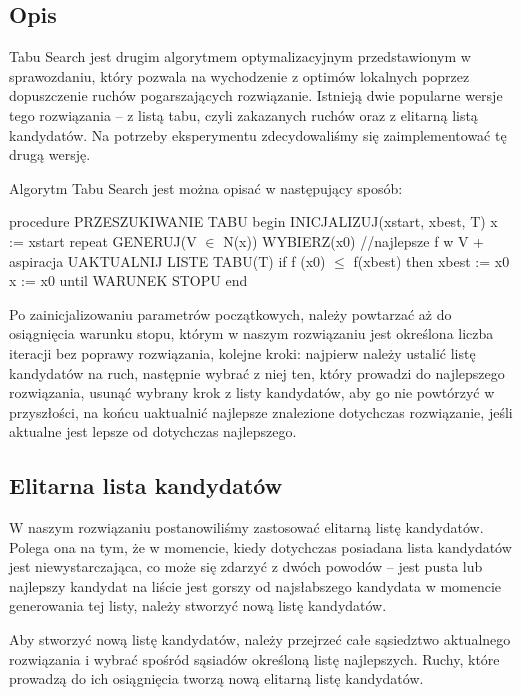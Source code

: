 \subsection{Opis}

Tabu Search jest drugim algorytmem optymalizacyjnym przedstawionym w sprawozdaniu, który pozwala na wychodzenie z optimów lokalnych poprzez dopuszczenie ruchów pogarszających rozwiązanie. Istnieją dwie popularne wersje tego rozwiązania -- z listą tabu, czyli zakazanych ruchów oraz z elitarną listą kandydatów. Na potrzeby eksperymentu zdecydowaliśmy się zaimplementować tę drugą wersję.

Algorytm Tabu Search jest można opisać w następujący sposób\cite{TS}:

\begin{algorithm}[caption={Integer division.}, label={alg1}]
procedure PRZESZUKIWANIE TABU
begin
  INICJALIZUJ(xstart, xbest, T)
  x := xstart
  repeat
    GENERUJ(V $\in$ N(x))
    WYBIERZ(x0) //najlepsze f w V + aspiracja
    UAKTUALNIJ LISTE TABU(T)
    if f (x0) $\le$ f(xbest) then xbest := x0
    x := x0
  until WARUNEK STOPU
end
\end{algorithm}

Po zainicjalizowaniu parametrów początkowych, należy powtarzać aż do osiągnięcia warunku stopu, którym w naszym rozwiązaniu jest określona liczba iteracji bez poprawy rozwiązania, kolejne kroki: najpierw należy ustalić listę kandydatów na ruch, następnie wybrać z niej ten, który prowadzi do najlepszego rozwiązania, usunąć wybrany krok z listy kandydatów, aby go nie powtórzyć w przyszłości, na końcu uaktualnić najlepsze znalezione dotychczas rozwiązanie, jeśli aktualne jest lepsze od dotychczas najlepszego.

\subsection{Elitarna lista kandydatów}

W naszym rozwiązaniu postanowiliśmy zastosować elitarną listę kandydatów. Polega ona na tym, że w momencie, kiedy dotychczas posiadana lista kandydatów jest niewystarczająca, co może się zdarzyć z dwóch powodów -- jest pusta lub najlepszy kandydat na liście jest gorszy od najsłabszego kandydata w momencie generowania tej listy, należy stworzyć nową listę kandydatów.

Aby stworzyć nową listę kandydatów, należy przejrzeć całe sąsiedztwo aktualnego rozwiązania i wybrać spośród sąsiadów określoną listę najlepszych. Ruchy, które prowadzą do ich osiągnięcia tworzą nową elitarną listę kandydatów.

